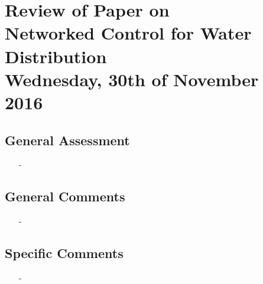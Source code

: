 
\renewcommand{\vec}[1]{\boldsymbol{\mathbf{#1}}}

\renewcommand\chaptername{KAPITEL}
\renewcommand\contentsname{Indhold}
\renewcommand\figurename{Figur}
\renewcommand\tablename{Tabel}

\section*{Review of Paper on\\
Networked Control for Water Distribution\\
\small Wednesday, 30th of November 2016}
\subsection{General Assessment}
\begin{itemize}
	\item[-]
\end{itemize}
\subsection{General Comments}
\begin{itemize}
	\item[-] 
\end{itemize}	
\subsection{Specific Comments}
\begin{itemize}
	\item[-]
\end{itemize}

